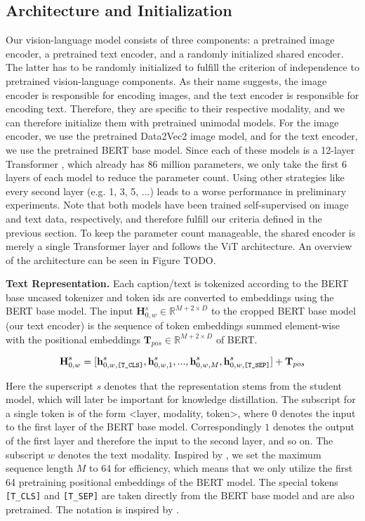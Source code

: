 \documentclass[10pt]{article} %
\begin{document}
\subsection{Architecture and Initialization}
Our vision-language model consists of three components: a pretrained image encoder, a pretrained text encoder, and a randomly initialized
shared encoder.
The latter has to be randomly initialized to fulfill the criterion of independence to pretrained vision-language components.
As their name suggests, the image encoder is responsible for encoding images, and the text encoder is responsible for encoding text.
Therefore, they are specific to their respective modality, and we can therefore initialize them with pretrained unimodal models.
For the image encoder, we use the pretrained Data2Vec2 \citep{data2vec2} image model, and for the text encoder, we use the pretrained
BERT base \citep{bert} model. Since each of these models is a 12-layer Transformer \citep{transformer}, which already has 86 million
parameters, we only take the first 6 layers of each model to reduce the parameter count. Using other strategies like every second layer
(e.g. 1, 3, 5, ...) leads to a worse performance in preliminary experiments. Note that both models have been trained self-supervised on
image and text data, respectively, and therefore fulfill our criteria defined in the previous section. To keep the parameter count manageable,
the shared encoder is merely a single Transformer layer and follows the ViT \citep{vit} architecture. An overview of the architecture can
be seen in Figure TODO.

\textbf{Text Representation.} Each caption/text is tokenized according to the BERT base uncased tokenizer \citep{bert} and token ids are converted
to embeddings using the BERT base model. The input $\textbf{H}^{s}_{0, w} \in \mathbb{R}^{M+2\times D}$ to the
cropped BERT base model (our text encoder) is the sequence
of token embeddings summed element-wise with the positional embeddings $\textbf{T}_{pos} \in \mathbb{R}^{M+2\times D}$ of BERT.

\[
\textbf{H}^{s}_{0, w} = [\textbf{h}^{s}_{0, w, \text{\texttt{[T\_CLS]}}}, \textbf{h}^{s}_{0, w, 1}, ..., \textbf{h}^{s}_{0, w, M}, \textbf{h}^{s}_{0, w, \text{\texttt{[T\_SEP]}}}] + \textbf{T}_{pos}
\]

Here the superscript $s$ denotes that the representation stems from the student model, which will later be important for knowledge distillation.
The subscript for a single token is of the form <layer, modality, token>, where $0$ denotes the input to the first layer of the BERT base model.
Correspondingly $1$ denotes the output of the first layer and
therefore the input to the second layer, and so on. The subscript $w$ denotes the text modality.
Inspired by \citet{beit3}, we set the maximum sequence length $M$ to 64 for efficiency, which means that we
only utilize the first 64 pretraining positional embeddings of the BERT model. The special tokens \texttt{[T\_CLS]} and \texttt{[T\_SEP]}
are taken directly from the BERT base model and are also pretrained. 
The notation is inspired by \citet{vlmo}.
\end{document}
